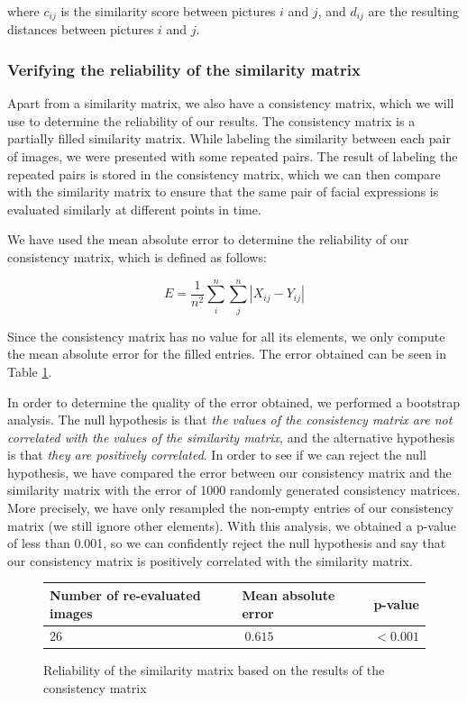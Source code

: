 \documentclass[11pt, a4paper]{article}
\numberwithin{equation}{subsection}
\begin{document}
where $c_{ij}$ is the similarity score between pictures $i$ and $j$, and $d_{ij}$ are the resulting distances between pictures $i$ and $j$.


\subsubsection{Verifying the reliability of the similarity matrix}\label{analysis_sim_matrix}

Apart from a similarity matrix, we also have a consistency matrix, which we will use to determine the reliability of our results. The consistency matrix is a partially filled similarity matrix. While labeling the similarity between each pair of images, we were presented with some repeated pairs. The result of labeling the repeated pairs is stored in the consistency matrix, which we can then compare with the similarity matrix to ensure that the same pair of facial expressions is evaluated similarly at different points in time.

We have used the mean absolute error to determine the reliability of our consistency matrix, which is defined as follows:

\begin{equation}\label{eq:mean_abs_error}
    E = \frac{1}{n^2} \sum_i^n\sum_j^n |{X_{ij} - Y_{ij}}|
\end{equation}

Since the consistency matrix has no value for all its elements, we only compute the mean absolute error for the filled entries. The error obtained can be seen in Table \ref{tab:similarity_reliability}.

In order to determine the quality of the error obtained, we performed a bootstrap analysis. The null hypothesis is that \textit{the values of the consistency matrix are not correlated with the values of the similarity matrix}, and the alternative hypothesis is that \textit{they are positively correlated}. In order to see if we can reject the null hypothesis, we have compared the error between our consistency matrix and the similarity matrix with the error of 1000 randomly generated consistency matrices. More precisely, we have only resampled the non-empty entries of our consistency matrix (we still ignore other elements). With this analysis, we obtained a p-value of less than 0.001, so we can confidently reject the null hypothesis and say that our consistency matrix is positively correlated with the similarity matrix.

\begin{figure}[h]
    \centering
    \begin{tabular}{l|l|l}
            \textbf{Number of re-evaluated images} & \textbf{Mean absolute error} & \textbf{p-value} \\ \hline
            $26$                                     & $~0.615$                       & $< 0.001$          \\
    \end{tabular}
    \captionsetup{type=table}
    \caption{Reliability of the similarity matrix based on the results of the consistency matrix}
    \label{tab:similarity_reliability}
\end{figure}
\end{document}
